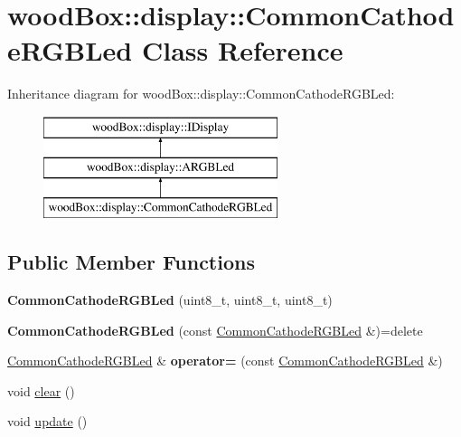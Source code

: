 \hypertarget{classwood_box_1_1display_1_1_common_cathode_r_g_b_led}{}\section{wood\+Box\+:\+:display\+:\+:Common\+Cathode\+R\+G\+B\+Led Class Reference}
\label{classwood_box_1_1display_1_1_common_cathode_r_g_b_led}
Inheritance diagram for wood\+Box\+:\+:display\+:\+:Common\+Cathode\+R\+G\+B\+Led\+:\begin{figure}[H]
\begin{center}
\leavevmode
\includegraphics[height=3.000000cm]{classwood_box_1_1display_1_1_common_cathode_r_g_b_led}
\end{center}
\end{figure}
\subsection*{Public Member Functions}
\begin{DoxyCompactItemize}
\item 
\mbox{\label{classwood_box_1_1display_1_1_common_cathode_r_g_b_led_ae80f49d3de90e4fa71c1a7b1d53c4860}} 
{\bfseries Common\+Cathode\+R\+G\+B\+Led} (uint8\+\_\+t, uint8\+\_\+t, uint8\+\_\+t)
\item 
\mbox{\label{classwood_box_1_1display_1_1_common_cathode_r_g_b_led_ac51ed1f3b287d14ee7cb1bebd52dde9a}} 
{\bfseries Common\+Cathode\+R\+G\+B\+Led} (const \mbox{\hyperlink{classwood_box_1_1display_1_1_common_cathode_r_g_b_led}{Common\+Cathode\+R\+G\+B\+Led}} \&)=delete
\item 
\mbox{\label{classwood_box_1_1display_1_1_common_cathode_r_g_b_led_ac63439ba3808fb22cbcee7fb1c061b03}} 
\mbox{\hyperlink{classwood_box_1_1display_1_1_common_cathode_r_g_b_led}{Common\+Cathode\+R\+G\+B\+Led}} \& {\bfseries operator=} (const \mbox{\hyperlink{classwood_box_1_1display_1_1_common_cathode_r_g_b_led}{Common\+Cathode\+R\+G\+B\+Led}} \&)
\item 
void \mbox{\hyperlink{classwood_box_1_1display_1_1_common_cathode_r_g_b_led_a4ae3f4b7e03751dd6352adfa1b90fca0}{clear}} ()
\item 
void \mbox{\hyperlink{classwood_box_1_1display_1_1_common_cathode_r_g_b_led_a597c7ae002c7f94431ccaafd160a857a}{update}} ()
\end{DoxyCompactItemize}


